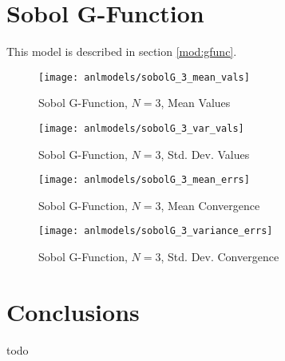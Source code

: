 \section{Sobol G-Function}
This model is described in section \ref{mod:gfunc}.
\begin{figure}[H]
  \centering
  \texttt{[image: anlmodels/sobolG\_3\_mean\_vals]}
  \caption{Sobol G-Function, $N=3$, Mean Values}
  \label{fig:sobolG mean values 3}
\end{figure}
\begin{figure}[H]
  \centering
  \texttt{[image: anlmodels/sobolG\_3\_var\_vals]}
  \caption{Sobol G-Function, $N=3$, Std. Dev. Values}
  \label{fig:sobolG var values 3}
\end{figure}

\begin{figure}[H]
  \centering
  \texttt{[image: anlmodels/sobolG\_3\_mean\_errs]}
  \caption{Sobol G-Function, $N=3$, Mean Convergence}
  \label{fig:sobolG mean errors 3}
\end{figure}
\begin{figure}[H]
  \centering
  \texttt{[image: anlmodels/sobolG\_3\_variance\_errs]}
  \caption{Sobol G-Function, $N=3$, Std. Dev. Convergence}
  \label{fig:sobolG var errors 3}
\end{figure}

\section{Conclusions}
todo
